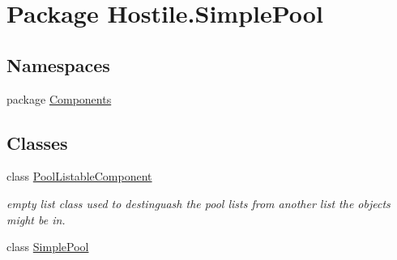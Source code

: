 \hypertarget{namespace_hostile_1_1_simple_pool}{\section{Package Hostile.\-Simple\-Pool}
\label{namespace_hostile_1_1_simple_pool}
}
\subsection*{Namespaces}
\begin{DoxyCompactItemize}
\item 
package \hyperlink{namespace_hostile_1_1_simple_pool_1_1_components}{Components}
\end{DoxyCompactItemize}
\subsection*{Classes}
\begin{DoxyCompactItemize}
\item 
class \hyperlink{class_hostile_1_1_simple_pool_1_1_pool_listable_component}{Pool\-Listable\-Component}
\begin{DoxyCompactList}\small\item\em empty list class used to destinguash the pool lists from another list the objects might be in. \end{DoxyCompactList}\item 
class \hyperlink{class_hostile_1_1_simple_pool_1_1_simple_pool}{Simple\-Pool}
\end{DoxyCompactItemize}
